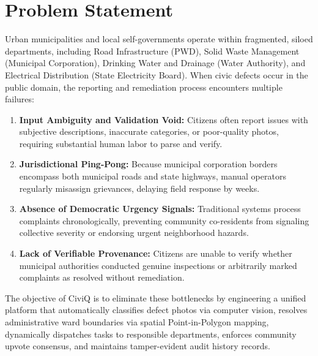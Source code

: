 \documentclass[12pt,a4paper]{report}
\begin{document}
\section{Problem Statement}
Urban municipalities and local self-governments operate within fragmented, siloed departments, including Road Infrastructure (PWD), Solid Waste Management (Municipal Corporation), Drinking Water and Drainage (Water Authority), and Electrical Distribution (State Electricity Board). When civic defects occur in the public domain, the reporting and remediation process encounters multiple failures:
\begin{enumerate}
    \item \textbf{Input Ambiguity and Validation Void:} Citizens often report issues with subjective descriptions, inaccurate categories, or poor-quality photos, requiring substantial human labor to parse and verify.
    \item \textbf{Jurisdictional Ping-Pong:} Because municipal corporation borders encompass both municipal roads and state highways, manual operators regularly misassign grievances, delaying field response by weeks.
    \item \textbf{Absence of Democratic Urgency Signals:} Traditional systems process complaints chronologically, preventing community co-residents from signaling collective severity or endorsing urgent neighborhood hazards.
    \item \textbf{Lack of Verifiable Provenance:} Citizens are unable to verify whether municipal authorities conducted genuine inspections or arbitrarily marked complaints as resolved without remediation.
\end{enumerate}

The objective of CiviQ is to eliminate these bottlenecks by engineering a unified platform that automatically classifies defect photos via computer vision, resolves administrative ward boundaries via spatial Point-in-Polygon mapping, dynamically dispatches tasks to responsible departments, enforces community upvote consensus, and maintains tamper-evident audit history records.
\end{document}
